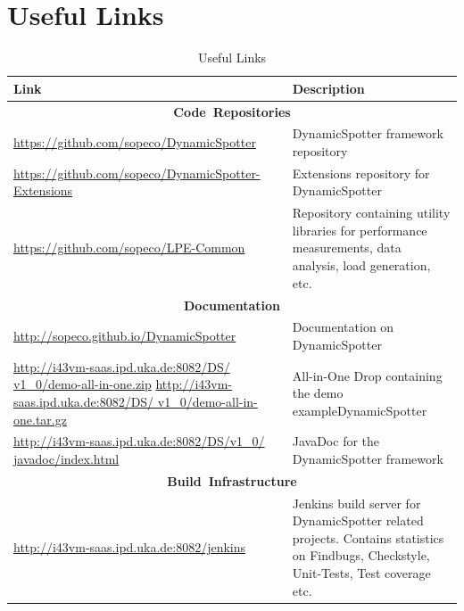 \documentclass{report}
\newcommand{\DS}{DynamicSpotter }
\newcommand{\link}[1]{\textcolor[rgb]{0.0,0.0,1.0}{\href{#1}{#1}}}
\begin{document}
\section{Useful Links}
\label{sec:links}
\begin{table}[h]
\centering
\begin{tabular}{p{}p{}}
\toprule
 \textbf{Link} & \textbf{Description}\\
\midrule
\midrule
\multicolumn{2}{c}{\mbox{\textbf{Code Repositories}}}\\
\midrule
\small{\link{https://github.com/sopeco/DynamicSpotter}} & \DS framework
repository\\
\midrule
\small{\link{https://github.com/sopeco/DynamicSpotter-Extensions}}
& Extensions repository for \DS\\
\midrule
\small{\link{https://github.com/sopeco/LPE-Common}} & Repository containing
utility libraries for performance measurements, data analysis, load generation, etc.\\
\midrule
\multicolumn{2}{c}{\mbox{\textbf{Documentation}}}\\
\midrule
\small{\link{http://sopeco.github.io/DynamicSpotter}}
& Documentation on \DS\\
\midrule
\small{\textcolor[rgb]{0.0,0.0,1.0}{\href{http://i43vm-saas.ipd.uka.de:8082/DS/v1\_0/demo-all-in-one.zip}{http://i43vm-saas.ipd.uka.de:8082/DS/
v1\_0/demo-all-in-one.zip}}}
\newline
\newline
\small{\textcolor[rgb]{0.0,0.0,1.0}{\href{http://i43vm-saas.ipd.uka.de:8082/DS/v1\_0/demo-all-in-one.zip}{http://i43vm-saas.ipd.uka.de:8082/DS/
v1\_0/demo-all-in-one.tar.gz}}}
& All-in-One Drop containing the demo example\DS\\
\midrule
\small{\textcolor[rgb]{0.0,0.0,1.0}{\href{http://i43vm-saas.ipd.uka.de:8082/DS/v1\_0/javadoc/index.html}{http://i43vm-saas.ipd.uka.de:8082/DS/v1\_0/
javadoc/index.html}}} & JavaDoc for the \DS framework\\
\midrule
\multicolumn{2}{c}{\mbox{\textbf{Build Infrastructure}}}\\
\midrule
\small{\link{http://i43vm-saas.ipd.uka.de:8082/jenkins}}
& Jenkins build server for \DS related projects. Contains statistics on Findbugs, Checkstyle, Unit-Tests, Test
coverage etc.\\
\bottomrule
\end{tabular}
\caption{Useful Links}
\label{tab:usefulLinks}
\end{table}



\end{document}
